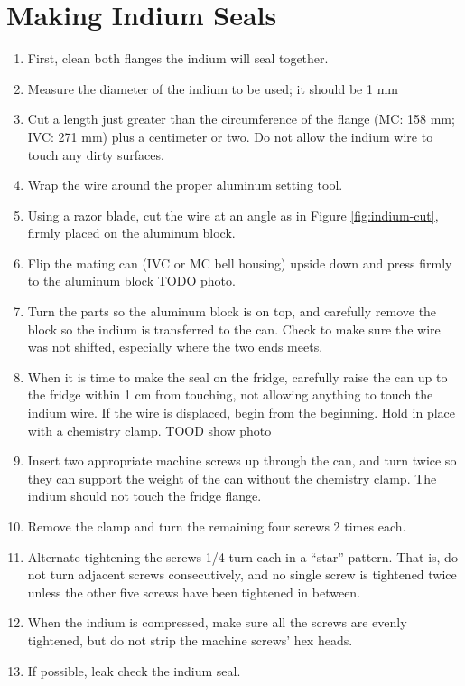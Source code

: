 \section{Making Indium Seals}


\begin{enumerate}
 \item First, clean both flanges the indium will seal together.
 \item Measure the diameter of the indium to be used; it should be 1 mm
 \item Cut a length just greater than the circumference of the flange (MC: 158 mm; IVC: 271 mm) plus a centimeter or two.  Do not allow the indium wire to touch any dirty surfaces.
 \item Wrap the wire around the proper aluminum setting tool.
 \item Using a razor blade, cut the wire at an angle as in Figure \ref{fig:indium-cut}, firmly placed on the aluminum block.
 \item Flip the mating can (IVC or MC bell housing) upside down and press firmly to the aluminum block TODO photo.
 \item Turn the parts so the aluminum block is on top, and carefully remove the block so the indium is transferred to the can.  Check to make sure the wire was not shifted, especially where the two ends meets.
 \item When it is time to make the seal on the fridge, carefully raise the can up to the fridge within 1 cm from touching, not allowing anything to touch the indium wire.  If the wire is displaced, begin from the beginning.  Hold in place with a chemistry clamp. TOOD show photo
 \item Insert two appropriate machine screws up through the can, and turn twice so they can support the weight of the can without the chemistry clamp.  The indium should not touch the fridge flange.
 \item Remove the clamp and turn the remaining four screws 2 times each.
 \item Alternate tightening the screws 1/4 turn each in a ``star'' pattern.  That is, do not turn adjacent screws consecutively, and no single screw is tightened twice unless the other five screws have been tightened in between.
 \item When the indium is compressed, make sure all the screws are evenly tightened, but do not strip the machine screws' hex heads.
 \item If possible, leak check the indium seal.
\end{enumerate}

